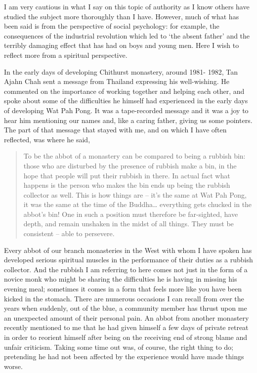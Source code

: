 I am very cautious in what I say on this topic of authority as I know
others have studied the subject more thoroughly than I have. However,
much of what has been said is from the perspective of social psychology:
for example, the consequences of the industrial revolution which led to
`the absent father' and the terribly damaging effect that has had on
boys and young men. Here I wish to reflect more from a spiritual
perspective.

In the early days of developing Chithurst monastery, around 1981- 1982,
Tan Ajahn Chah sent a message from Thailand expressing his well-wishing.
He commented on the importance of working together and helping each
other, and spoke about some of the difficulties he himself had
experienced in the early days of developing Wat Pah Pong. It was a
tape-recorded message and it was a joy to hear him mentioning our names
and, like a caring father, giving us some pointers. The part of that
message that stayed with me, and on which I have often reflected, was
where he said,

\begin{quotation}
To be the abbot of a monastery can be compared to being a rubbish bin:
those who are disturbed by the presence of rubbish make a bin, in the
hope that people will put their rubbish in there. In actual fact what
happens is the person who makes the bin ends up being the rubbish
collector as well. This is how things are -- it's the same at Wat Pah
Pong, it was the same at the time of the Buddha\ldots{} everything gets
chucked in the abbot's bin! One in such a position must therefore be
far-sighted, have depth, and remain unshaken in the midst of all things.
They must be consistent -- able to persevere.\cite{seeing}
\end{quotation}

Every abbot of our branch monasteries in the West with whom I have
spoken has developed serious spiritual muscles in the performance of
their duties as a rubbish collector. And the rubbish I am referring to
here comes not just in the form of a novice monk who might be sharing
the difficulties he is having in missing his evening meal; sometimes it
comes in a form that feels more like you have been kicked in the
stomach. There are numerous occasions I can recall from over the years
when suddenly, out of the blue, a community member has thrust upon me an
unexpected amount of their personal pain. An abbot from another
monastery recently mentioned to me that he had given himself a few days
of private retreat in order to reorient himself after being on the
receiving end of strong blame and unfair criticism. Taking some time out
was, of course, the right thing to do; pretending he had not been
affected by the experience would have made things worse.

